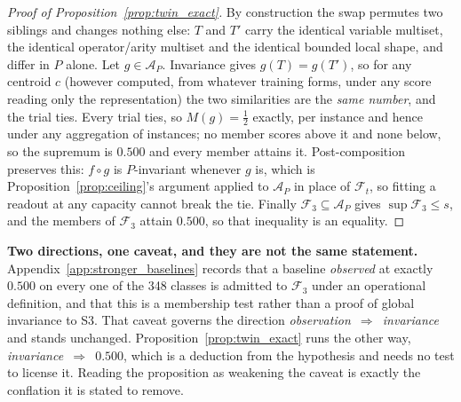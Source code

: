\begin{proof}[Proof of Proposition~\ref{prop:twin_exact}]
By construction the swap permutes two siblings and changes nothing else: $T$ and $T'$ carry the identical variable multiset, the identical operator/arity multiset and the identical bounded local shape, and differ in $P$ alone. Let $g\in\mathcal{A}_P$. Invariance gives $g(T)=g(T')$, so for any centroid $c$ (however computed, from whatever training forms, under any score reading only the representation) the two similarities are the \emph{same number}, and the trial ties. Every trial ties, so $M(g)=\tfrac{1}{2}$ exactly, per instance and hence under any aggregation of instances; no member scores above it and none below, so the supremum is $0.500$ and every member attains it. Post-composition preserves this: $f\circ g$ is $P$-invariant whenever $g$ is, which is Proposition~\ref{prop:ceiling}'s argument applied to $\mathcal{A}_P$ in place of $\mathcal{F}_t$, so fitting a readout at any capacity cannot break the tie. Finally $\mathcal{F}_3\subseteq\mathcal{A}_P$ gives $\sup\mathcal{F}_3\leq s$, and the members of $\mathcal{F}_3$ attain $0.500$, so that inequality is an equality.
\end{proof}

\noindent \textbf{Two directions, one caveat, and they are not the same statement.} Appendix~\ref{app:stronger_baselines} records that a baseline \emph{observed} at exactly $0.500$ on every one of the 348 classes is admitted to $\mathcal{F}_3$ under an operational definition, and that this is a membership test rather than a proof of global invariance to S3. That caveat governs the direction \emph{observation~$\Rightarrow$~invariance} and stands unchanged. Proposition~\ref{prop:twin_exact} runs the other way, \emph{invariance~$\Rightarrow$~$0.500$}, which is a deduction from the hypothesis and needs no test to license it. Reading the proposition as weakening the caveat is exactly the conflation it is stated to remove.

